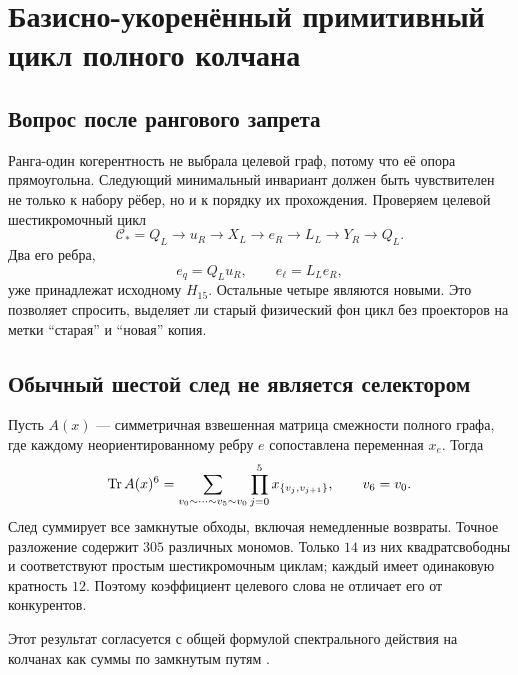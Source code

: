 \chapter{Базисно-укоренённый примитивный цикл полного колчана}
\label{ch:v7-baseline-rooted-primitive-cycle-admission-gate}

\section{Вопрос после рангового запрета}

Ранга-один когерентность не выбрала целевой граф, потому что её опора
прямоугольна. Следующий минимальный инвариант должен быть чувствителен не
только к набору рёбер, но и к порядку их прохождения. Проверяем целевой
шестикромочный цикл
\begin{equation}
 \mathcal C_*=Q_L\to u_R\to X_L\to e_R\to L_L\to Y_R\to Q_L.
 \label{eq:v7-rooted-cycle-target}
\end{equation}
Два его ребра,
\begin{equation}
 e_q=Q_Lu_R,\qquad e_\ell=L_Le_R,
 \label{eq:v7-rooted-cycle-baseline-edges}
\end{equation}
уже принадлежат исходному $H_{15}$. Остальные четыре являются новыми.
Это позволяет спросить, выделяет ли старый физический фон цикл без
проекторов на метки ``старая'' и ``новая'' копия.

\section{Обычный шестой след не является селектором}

Пусть $A(x)$ --- симметричная взвешенная матрица смежности полного графа,
где каждому неориентированному ребру $e$ сопоставлена переменная $x_e$.
Тогда
\begin{equation}
 \operatorname{Tr} A(x)^6
 =\sum_{v_0\sim\cdots\sim v_5\sim v_0}
   \prod_{j=0}^{5}x_{\{v_j,v_{j+1}\}},
 \qquad v_6=v_0.
 \label{eq:v7-rooted-cycle-ordinary-trace}
\end{equation}
След суммирует все замкнутые обходы, включая немедленные возвраты.
Точное разложение содержит $305$ различных мономов. Только $14$ из них
квадратсвободны и соответствуют простым шестикромочным циклам; каждый
имеет одинаковую кратность $12$. Поэтому коэффициент целевого слова не
отличает его от конкурентов.

Этот результат согласуется с общей формулой спектрального действия на
колчанах как суммы по замкнутым путям \cite{v7-rooted-cycle-quiver-action}.

